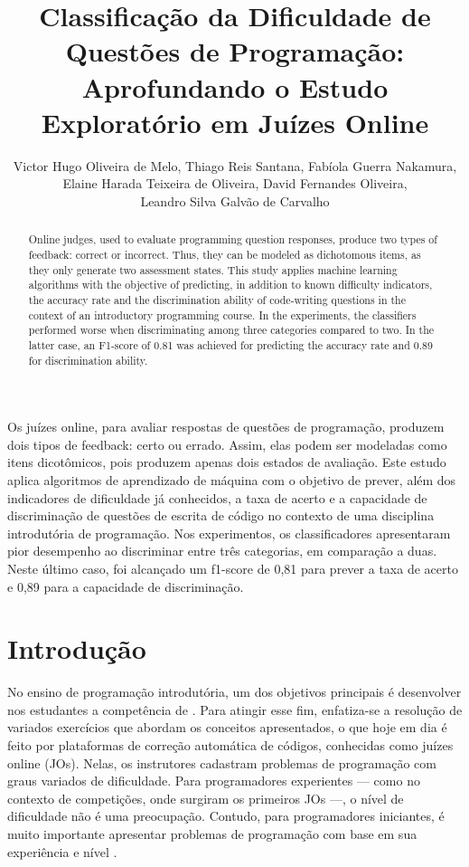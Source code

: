 \documentclass[12pt]{article}
\title{Classificação da Dificuldade de Questões de Programação: Aprofundando o Estudo Exploratório em Juízes Online}
\author{Victor Hugo Oliveira de Melo, Thiago Reis Santana, Fabíola Guerra Nakamura,\\Elaine Harada Teixeira de Oliveira, David Fernandes Oliveira,\\Leandro Silva Galvão de Carvalho}
\begin{document}
\maketitle

\begin{resumo}
Os juízes online, para avaliar respostas de questões de programação, produzem dois tipos de feedback: certo ou errado. Assim, elas podem ser modeladas como itens dicotômicos, pois produzem apenas dois estados de avaliação. Este estudo aplica algoritmos de aprendizado de máquina com o objetivo de prever, além dos indicadores de dificuldade já conhecidos, a taxa de acerto e a capacidade de discriminação de questões de escrita de código no contexto de uma disciplina introdutória de programação. Nos experimentos, os classificadores apresentaram pior desempenho ao discriminar entre três categorias, em comparação a duas. Neste último caso, foi alcançado um f1-score de 0,81 para prever a taxa de acerto e 0,89 para a capacidade de discriminação.
\end{resumo}

\begin{abstract}
Online judges, used to evaluate programming question responses, produce two types of feedback: correct or incorrect. Thus, they can be modeled as dichotomous items, as they only generate two assessment states. This study applies machine learning algorithms with the objective of predicting, in addition to known difficulty indicators, the accuracy rate and the discrimination ability of code-writing questions in the context of an introductory programming course. In the experiments, the classifiers performed worse when discriminating among three categories compared to two. In the latter case, an F1-score of 0.81 was achieved for predicting the accuracy rate and 0.89 for discrimination ability.
\end{abstract}

\section{Introdução}

No ensino de programação introdutória, um dos objetivos principais é desenvolver nos estudantes a competência de  \cite{referenciaisSBC2017}. Para atingir esse fim, enfatiza-se a resolução de variados exercícios que abordam os conceitos apresentados, o que hoje em dia é feito por plataformas de correção automática de códigos, conhecidas como juízes online (JOs). Nelas, os instrutores cadastram problemas de programação com graus variados de dificuldade. Para programadores experientes --- como no contexto de competições, onde surgiram os primeiros JOs \cite{Wasik2018} ---, o nível de dificuldade não é uma preocupação. Contudo, para programadores iniciantes, é muito importante apresentar problemas de programação com base em sua experiência e nível \cite{zhao2018}.
\end{document}
